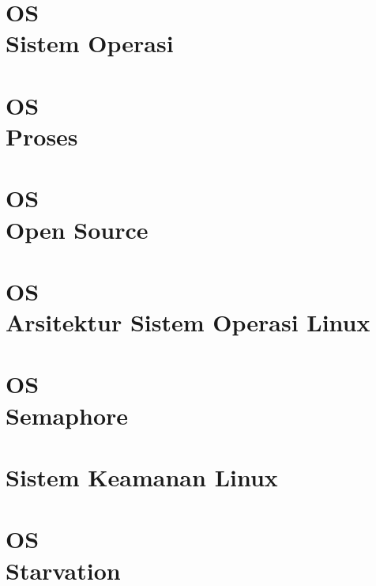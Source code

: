 \documentclass{wileySix}
\begin{document}
%

\chapter[Sistem Operasi]
{OS\\ Sistem Operasi}


\chapter[Proses OS]
{OS\\ Proses}
	

\chapter[Open Sourcei]
{OS\\ Open Source}


\chapter[Linux]
{OS\\ Arsitektur Sistem Operasi Linux}


\chapter[OS Semaphore]
{OS\\ Semaphore}




%


\chapter[Sistem Keamanan Linux]
{Sistem Keamanan Linux}


\chapter[Starvation]
{OS\\ Starvation}

\end{document}
